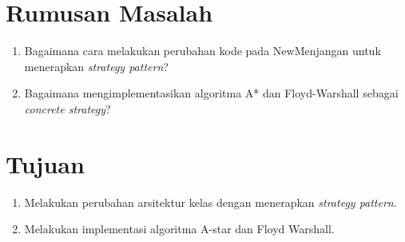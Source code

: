 \documentclass[a4paper,twoside]{article}
\begin{document}
\section{Rumusan Masalah}
\begin{enumerate}
    \item Bagaimana cara melakukan perubahan kode pada NewMenjangan untuk menerapkan \textit{strategy pattern}?
    \item Bagaimana mengimplementasikan algoritma A* dan Floyd-Warshall sebagai \textit{concrete strategy}?
\end{enumerate}

\section{Tujuan}
\begin{enumerate}
    \item Melakukan perubahan arsitektur kelas dengan menerapkan \textit{strategy pattern}.
    \item Melakukan implementasi algoritma A-star dan Floyd Warshall.
\end{enumerate}
\end{document}
